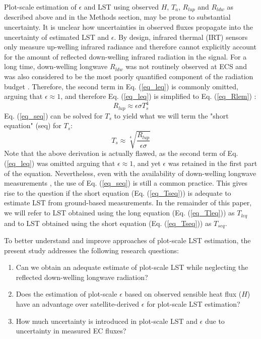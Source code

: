 \documentclass[fleqn,10pt]{wlscirep}
\providecommand{\DIFaddtex}[1]{{\protect\color{blue}\uwave{#1}}} %
\providecommand{\DIFdeltex}[1]{{\protect\color{red}\sout{#1}}}                      %
\providecommand{\DIFaddbegin}{} %
\providecommand{\DIFaddend}{} %
\providecommand{\DIFdelbegin}{} %
\providecommand{\DIFdelend}{} %
\providecommand{\DIFadd}[1]{\texorpdfstring{\DIFaddtex{#1}}{#1}} %
\providecommand{\DIFdel}[1]{\texorpdfstring{\DIFdeltex{#1}}{}} %
\begin{document}
Plot-scale estimation of $\epsilon$ and LST using observed $H$, $T_{a}$, $R_{lup}$ and \DIFdelbegin \DIFdel{$R_{ldw}$ }\DIFdelend \DIFaddbegin \DIFadd{$R_{ldwn}$ }\DIFaddend as described above and in the Methods section, may be prone to substantial uncertainty. It is unclear how uncertainties in observed fluxes propagate into the uncertainty of estimated LST and $\epsilon$. By design, infrared thermal (IRT) sensors only measure up-welling infrared radiance and therefore cannot explicitly account for the amount of reflected down-welling infrared radiation in the signal. For a long time, down-welling longwave \DIFdelbegin \DIFdel{$R_{ldw}$ }\DIFdelend \DIFaddbegin \DIFadd{$R_{ldwn}$ }\DIFaddend was not routinely observed at ECS \cite{wang2009evaluation} and was also considered to be the most poorly quantified component of the radiation budget \cite{trenberth2012tracking}. Therefore, the second term in Eq. (\ref{eq_leq}) is commonly omitted, arguing that $\epsilon\approx 1$, and therefore Eq. (\ref{eq_leq}) is simplified to Eq. (\ref{eq_Rlem}) \cite{crago2014use}:
\begin{equation}\label{eq_seq}
R_{lup} \approx  \epsilon \sigma T_{s}^{4}                
\end{equation} 
Eq. (\ref{eq_seq}) can be solved for $T_s$ to yield what we will term the "short equation" (seq) for $T_s$:
\begin{equation}\label{eq_Tseq}
T_{s} \approx \sqrt[4]{\frac{R_{lup}}{\epsilon \sigma}}
\end{equation} 
Note that the above derivation is actually flawed, as the second term of Eq. (\ref{eq_leq}) was omitted arguing that $\epsilon\approx 1$, and yet $\epsilon$ was retained in the first part of the equation. Nevertheless, even with the availability of down-welling longwave measurements \cite{stephens1995review}, the use of Eq. (\ref{eq_seq}) is still a common practice\cite{crago2014use,mallick2018bridging}. This gives rise to the question if the short equation (Eq. (\ref{eq_Tseq})) is adequate to estimate LST from ground-based measurements. In the remainder of this paper, we will refer to LST obtained using the long equation (Eq. (\ref{eq_Tleq})) as $T_{leq}$ and to LST obtained using the short equation (Eq. (\ref{eq_Tseq})) as $T_{seq}$.

To better understand and improve approaches of plot-scale LST estimation, the present study addresses the following research questions:
\begin{enumerate}
	\item Can we obtain an adequate estimate of plot-scale LST while neglecting the reflected down-welling longwave radiation?
	\item Does the estimation of plot-scale $\epsilon$ based on observed sensible heat flux ($H$) have an advantage over satellite-derived $\epsilon$ for plot-scale LST estimation?   
    \item How much uncertainty is introduced in plot-scale LST and $\epsilon$ due to uncertainty in measured EC fluxes?    
\end{enumerate}    
\end{document}
